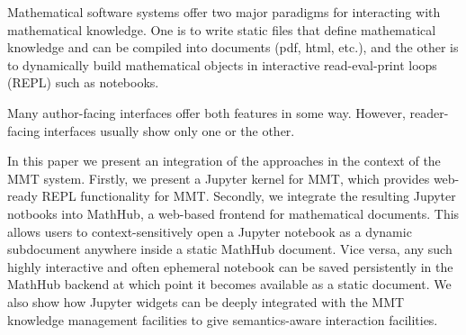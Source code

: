 Mathematical software systems offer two major paradigms for interacting with mathematical knowledge.
One is to write static files that define mathematical knowledge and can be compiled into documents (pdf, html, etc.), and the other is to dynamically build mathematical objects in interactive read-eval-print loops (REPL) such as notebooks.

Many author-facing interfaces offer both features in some way.
However, reader-facing interfaces usually show only one or the other.

In this paper we present an integration of the approaches in the context of the MMT system.
Firstly, we present a Jupyter kernel for MMT, which provides web-ready REPL functionality for MMT.
Secondly, we integrate the resulting Jupyter notbooks into MathHub, a web-based frontend for mathematical documents.
This allows users to context-sensitively open a Jupyter notebook as a dynamic subdocument anywhere inside a static MathHub document.
Vice versa, any such highly interactive and often ephemeral notebook can be saved persistently in the MathHub backend at which point it becomes available as a static document.
We also show how Jupyter widgets can be deeply integrated with the MMT knowledge management facilities to give semantics-aware interaction facilities.


